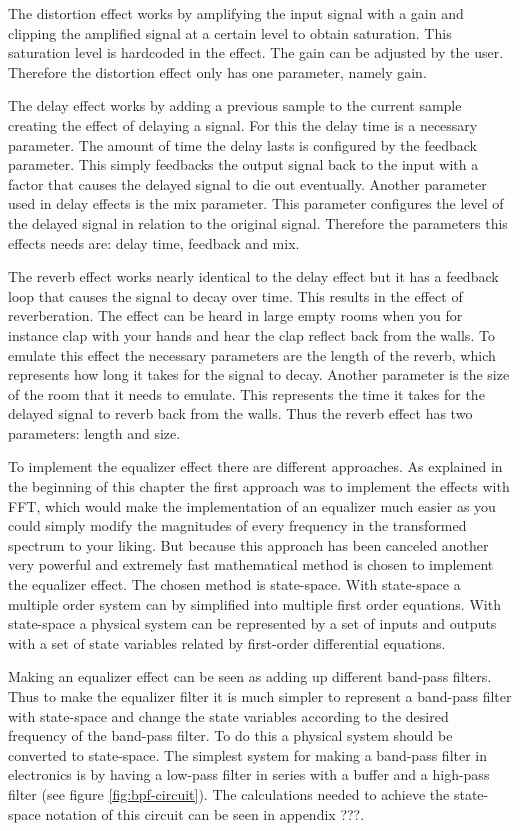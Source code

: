 The distortion effect works by amplifying the input signal with a gain and clipping the amplified signal at a certain level to obtain saturation. This saturation level is hardcoded in the effect. The gain can be adjusted by the user. Therefore the distortion effect only has one parameter, namely gain.

The delay effect works by adding a previous sample to the current sample creating the effect of delaying a signal. For this the delay time is a necessary parameter. The amount of time the delay lasts is configured by the feedback parameter. This simply feedbacks the output signal back to the input with a factor that causes the delayed signal to die out eventually. Another parameter used in delay effects is the mix parameter. This parameter configures the level of the delayed signal in relation to the original signal. Therefore the parameters this effects needs are: delay time, feedback and mix. 

The reverb effect works nearly identical to the delay effect but it has a feedback loop that causes the signal to decay over time. This results in the effect of reverberation. The effect can be heard in large empty rooms when you for instance clap with your hands and hear the clap reflect back from the walls. To emulate this effect the necessary parameters are the length of the reverb, which represents how long it takes for the signal to decay. Another parameter is the size of the room that it needs to emulate. This represents the time it takes for the delayed signal to reverb back from the walls. Thus the reverb effect has two parameters: length and size.

To implement the equalizer effect there are different approaches. As explained in the beginning of this chapter the first approach was to implement the effects with FFT, which would make the implementation of an equalizer much easier as you could simply modify the magnitudes of every frequency in the transformed spectrum to your liking. But because this approach has been canceled another very powerful and extremely fast mathematical method is chosen to implement the equalizer effect. The chosen method is state-space. With state-space a multiple order system can by simplified into multiple first order equations. With state-space a physical system can be represented by a set of inputs and outputs with a set of state variables related by first-order differential equations. 

Making an equalizer effect can be seen as adding up different band-pass filters. Thus to make the equalizer filter it is much simpler to represent a band-pass filter with state-space and change the state variables according to the desired frequency of the band-pass filter. To do this a physical system should be converted to state-space. The simplest system for making a band-pass filter in electronics is by having a low-pass filter in series with a buffer and a high-pass filter (see figure \ref{fig:bpf-circuit}). The calculations needed to achieve the state-space notation of this circuit can be seen in appendix ???.

